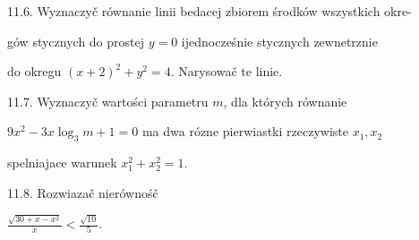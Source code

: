 \documentclass[a4paper,12pt]{article}
\begin{document}
11.6. Wyznaczyč równanie linii bedacej zbiorem środków wszystkich okre-

gów stycznych do prostej $y=0$ ijednocześnie stycznych zewnetrznie

do okregu $(x+2)^{2}+y^{2}=4$. Narysowač $\mathrm{t}\mathrm{e}$ linie.

11.7. Wyznaczyč wartości parametru $m$, dla których równanie

$9x^{2}-3x\log_{3}m+1=0$ ma dwa rózne pierwiastki rzeczywiste $x_{1}, x_{2}$

spelniajace warunek $x_{1}^{2}+x_{2}^{2}=1.$

11.8. Rozwiazač nierównośč

$\displaystyle \frac{\sqrt{30+x-x^{2}}}{x}<\frac{\sqrt{10}}{5}.$
\end{document}
